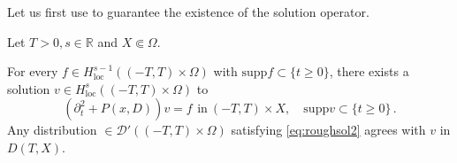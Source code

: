 \documentclass[
	fontsize=11pt, 
	twoside=false, 
	abstract=true, 
	a4paper,
]{scrartcl}
\newcommand{\RR}{\mathbb{R}}
\newcommand{\del}{\partial}
\newcommand{\supp}{\mathrm{supp}}
\newcommand{\td}[1]{\tilde{#1}}
\begin{document}
Let us first use \cite[Thm.~23.2.2]{zbMATH05129478} to guarantee the existence of the solution operator. %
\begin{lemma}\label{lem:ex}
	Let $T>0, s\in\RR$ and $X\Subset \Omega$.

	For every $f\in H^{s-1}_{\mathrm{loc}}((-T,T)\times \Omega)$ with $\supp f\subset \{t\geq 0\}$, there exists a solution $v\in H^s_{\mathrm{loc}}((-T,T)\times \Omega)$ to 
	\begin{equation}\label{eq:roughsol2}
		(\del_t^2+P(x,D))v = f\,\ \text{in}\ (-T,T)\times X, \quad \supp v \subset \{t\geq 0\}\,.
	\end{equation}
	Any distribution $\in \mathcal{D}'((-T,T)\times \Omega)$ satisfying \cref{eq:roughsol2} agrees with $v$ in $D(T,X)$.

	

\end{lemma}
\end{document}
